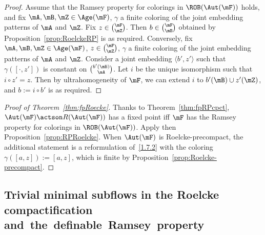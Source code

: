 \begin{proof}
Assume that the Ramsey property for colorings in $\ROB(\Aut(\mF))$ holds, and fix $\mA, \mB, \mZ\in \Age(\mF)$, $\gamma$ a finite coloring of the joint embedding patterns of $\mA$ and $\mZ$. Fix $z\in \binom{\mF}{\mZ}$. Then $b\in \binom{\mF}{\mB}$ obtained by Proposition~\ref{prop:RoelckeRP} is as required. Conversely, fix $\mA, \mB, \mZ\in \Age(\mF)$, $z\in \binom{\mF}{\mZ}$, $\gamma$ a finite coloring of the joint embedding patterns of $\mA$ and $\mZ$. Consider a joint embedding $\langle b',z'\rangle$ such that $\gamma([\cdot,z'])$ is constant on $\binom{b'(\mB)}{\mA}$. Let $i$ be the unique isomorphism such that $i\circ z'=z$. Then by ultrahomogeneity of $\mF$, we can extend $i$ to $b'(\mB)\cup z'(\mZ)$, and $b:=i\circ b'$ is as required.
\end{proof}

\begin{proof}[Proof of Theorem~\ref{thm:fpRoecke}]
Thanks to Theorem~\ref{thm:fpRPcpct}, $\Aut(\mF)\actson R(\Aut(\mF))$ has a fixed point iff $\mF$ has the Ramsey property for colorings in $\ROB(\Aut(\mF))$. Apply then Proposition~\ref{prop:RPRoelcke}. When $\Aut(\mF)$ is Roelcke-precompact, the additional statement is a reformulation of~\eqref{1.7.2} with the coloring $\gamma([a,z]):=[a,z]$, which is finite by Proposition~\ref{prop:Roelcke-precompact}.
\end{proof}

\subsection{Trivial minimal subflows in the Roelcke compactification and~the~definable~Ramsey~property}
\label{subsection:defRP}

